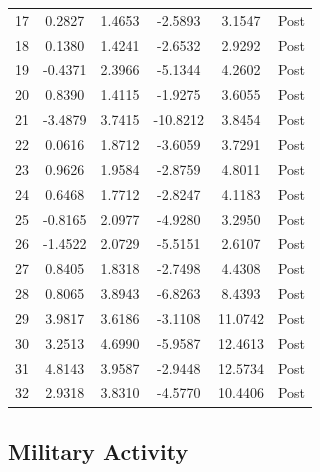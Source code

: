 \documentclass[bibtex]{article}
\begin{document}
{\begin{longtable}{cccccc}
17 & 0.2827 & 1.4653 & -2.5893 & 3.1547 & Post \\
18 & 0.1380 & 1.4241 & -2.6532 & 2.9292 & Post \\
19 & -0.4371 & 2.3966 & -5.1344 & 4.2602 & Post \\
20 & 0.8390 & 1.4115 & -1.9275 & 3.6055 & Post \\
21 & -3.4879 & 3.7415 & -10.8212 & 3.8454 & Post \\
22 & 0.0616 & 1.8712 & -3.6059 & 3.7291 & Post \\
23 & 0.9626 & 1.9584 & -2.8759 & 4.8011 & Post \\
24 & 0.6468 & 1.7712 & -2.8247 & 4.1183 & Post \\
25 & -0.8165 & 2.0977 & -4.9280 & 3.2950 & Post \\
26 & -1.4522 & 2.0729 & -5.5151 & 2.6107 & Post \\
27 & 0.8405 & 1.8318 & -2.7498 & 4.4308 & Post \\
28 & 0.8065 & 3.8943 & -6.8263 & 8.4393 & Post \\
29 & 3.9817 & 3.6186 & -3.1108 & 11.0742 & Post \\
30 & 3.2513 & 4.6990 & -5.9587 & 12.4613 & Post \\
31 & 4.8143 & 3.9587 & -2.9448 & 12.5734 & Post \\
32 & 2.9318 & 3.8310 & -4.5770 & 10.4406 & Post \\
\end{longtable}

\subsection{Military Activity}

}
\end{document}
